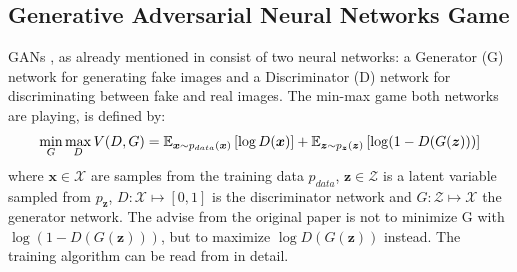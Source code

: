 
\subsection{Generative Adversarial Neural Networks Game}\label{sec:nn_theory_gan}
\thesisStateRevised
GANs \cite{Goodfellow2014}, as already mentioned in  consist of two neural networks: a Generator (G) network for generating fake images and a Discriminator (D) network for discriminating between fake and real images.
The min-max game both networks are playing, is defined by:
\begin{equation}\label{eq:nn_theory_gan}
  \underset{G}{\min} \, \underset{D}{\max} \, V(D, G) = \mathbb{E}_{\bm{x} \sim p_{data}(\bm{x})}\left[ \log D(\bm{x}) \right] + 
    \mathbb{E}_{\bm{z} \sim p_{\bm{z}}(\bm{z})}\left[ \log (1 - D(G(\bm{z}))) \right]
\end{equation}
where $\bm{x} \in \mathcal{X}$ are samples from the training data $p_{data}$, $\bm{z} \in \mathcal{Z}$ is a latent variable sampled from $p_{\bm{z}}$, $D: \mathcal{X} \mapsto [0, 1]$ is the discriminator network and $G: \mathcal{Z} \mapsto \mathcal{X}$ the generator network.
The advise from the original paper is not to minimize G with $\log (1 - D(G(\bm{z})))$, but to maximize $\log D(G(\bm{z}))$ instead.
The training algorithm can be read from \cite{Goodfellow2014} in detail.